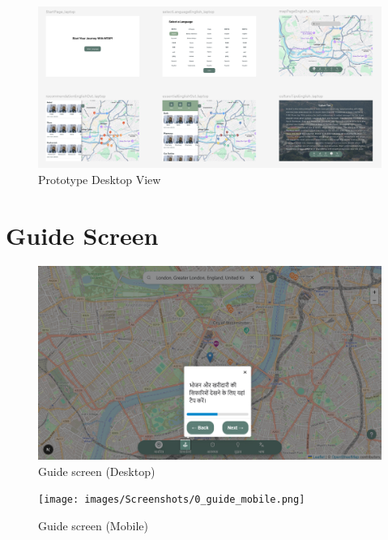 \begin{figure}[H]
    \centering
    \includegraphics[height=0.3\textheight, keepaspectratio]{images/prototype/desktopPrototype.png}
    \caption{Prototype Desktop View}
    \label{fig:appendix-prototype-desktop} 
\end{figure}

\section{Guide Screen}
\begin{figure}[H]
    \centering
    \includegraphics[height=0.2\textheight,keepaspectratio]{images/Screenshots/0_guide_desktop.png}
    \caption{Guide screen (Desktop)}
\end{figure}

\begin{figure}[H]
    \centering
    \texttt{[image: images/Screenshots/0\_guide\_mobile.png]}
    \caption{Guide screen (Mobile)}
\end{figure}

